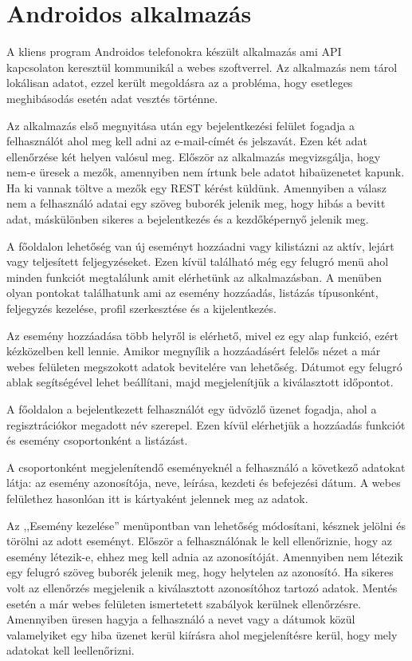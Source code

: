 \documentclass[
]{thesis-ekf}
\theoremstyle{definition}
\theoremstyle{remark}
\begin{document}
	\section{Androidos alkalmazás}
	A kliens program Androidos telefonokra készült alkalmazás ami API~\cite{api_basic} kapcsolaton keresztül kommunikál a webes szoftverrel. Az alkalmazás nem tárol lokálisan adatot, ezzel került megoldásra az a probléma, hogy esetleges meghibásodás esetén adat vesztés történne. 
	
	Az alkalmazás első megnyitása után egy bejelentkezési felület fogadja a felhasználót ahol meg kell adni az e-mail-címét és jelszavát. Ezen két adat ellenőrzése két helyen valósul meg. Először az alkalmazás megvizsgálja, hogy nem-e üresek a mezők, amennyiben nem írtunk bele adatot hibaüzenetet kapunk. Ha ki vannak töltve a mezők egy REST kérést küldünk. Amennyiben a válasz nem a felhasználó adatai egy szöveg buborék jelenik meg, hogy hibás a bevitt adat, máskülönben sikeres a bejelentkezés és a kezdőképernyő jelenik meg.
	
	A főoldalon lehetőség van új eseményt hozzáadni vagy kilistázni az aktív, lejárt vagy teljesített feljegyzéseket. Ezen kívül található még egy felugró menü ahol minden funkciót megtalálunk amit elérhetünk az alkalmazásban. A menüben olyan pontokat találhatunk ami az esemény hozzáadás, listázás típusonként, feljegyzés kezelése, profil szerkesztése és a kijelentkezés. 
	
	Az esemény hozzáadása több helyről is elérhető, mivel ez egy alap funkció, ezért kézközelben kell lennie. Amikor megnyílik a hozzáadásért felelős nézet a már webes felületen megszokott adatok bevitelére van lehetőség. Dátumot egy felugró ablak segítségével lehet beállítani, majd megjelenítjük a kiválasztott időpontot. 
	
	A főoldalon a bejelentkezett felhasználót egy üdvözlő üzenet fogadja, ahol a regisztrációkor megadott név szerepel. Ezen kívül elérhetjük a hozzáadás funkciót és esemény csoportonként a listázást. 
	
	A csoportonként megjelenítendő eseményeknél a felhasználó a következő adatokat látja: az esemény azonosítója, neve, leírása, kezdeti és befejezési dátum. A webes felülethez hasonlóan itt is kártyaként jelennek meg az adatok. 
	
	Az ,,Esemény kezelése'' menüpontban van lehetőség módosítani, késznek jelölni és törölni az adott eseményt. Először a felhasználónak le kell ellenőriznie, hogy az esemény létezik-e, ehhez meg kell adnia az azonosítóját. Amennyiben nem létezik egy felugró szöveg buborék jelenik meg, hogy helytelen az azonosító. Ha sikeres volt az ellenőrzés megjelenik a kiválasztott azonosítóhoz tartozó adatok. Mentés esetén a már webes felületen ismertetett szabályok kerülnek ellenőrzésre. Amennyiben üresen hagyja a felhasználó a nevet vagy a dátumok közül valamelyiket egy hiba üzenet kerül kiírásra ahol megjelenítésre kerül, hogy mely adatokat kell leellenőrizni. 
	
\end{document}

